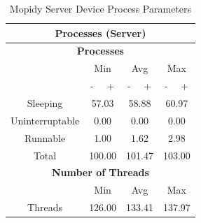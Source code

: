 \documentclass[11pt,a4paper,headinclude=false,footinclude=false]{scrreprt}
\begin{document}
\begin{table}[H]
\centering
    \begin{tabular}{||c|c|c|c|c|c|c||}
    \hline
    \multicolumn{7}{|c|}{\textbf{Processes (Server)}} \\
    \hline
    \multicolumn{7}{|c|}{\textbf{Processes}} \\
    \hline\hline
      & \multicolumn{2}{|c|}{Min} & \multicolumn{2}{|c|}{Avg} & \multicolumn{2}{|c|}{Max} \\
    \hline
      & - & + & - & + & - & + \\
    \hline
    Sleeping & \multicolumn{2}{|c|}{57.03} & \multicolumn{2}{|c|}{58.88} & \multicolumn{2}{|c|}{60.97} \\
    \hline
    Uninterruptable & \multicolumn{2}{|c|}{0.00} & \multicolumn{2}{|c|}{0.00} & \multicolumn{2}{|c|}{0.00} \\
    \hline
    Runnable & \multicolumn{2}{|c|}{1.00} & \multicolumn{2}{|c|}{1.62} & \multicolumn{2}{|c|}{2.98} \\
    \hline
    Total & \multicolumn{2}{|c|}{100.00} & \multicolumn{2}{|c|}{101.47} & \multicolumn{2}{|c|}{103.00} \\
    \hline\hline
    \multicolumn{7}{|c|}{\textbf{Number of Threads}} \\
    \hline\hline
      & \multicolumn{2}{|c|}{Min} & \multicolumn{2}{|c|}{Avg} & \multicolumn{2}{|c|}{Max} \\
    \hline
    Threads  & \multicolumn{2}{|c|}{126.00} & \multicolumn{2}{|c|}{133.41} & \multicolumn{2}{|c|}{137.97} \\
    \hline\hline
    \end{tabular}
    \caption{Mopidy Server Device Process Parameters}
    \label{MopidyserverProcessTab}
\end{table}
\end{document}
